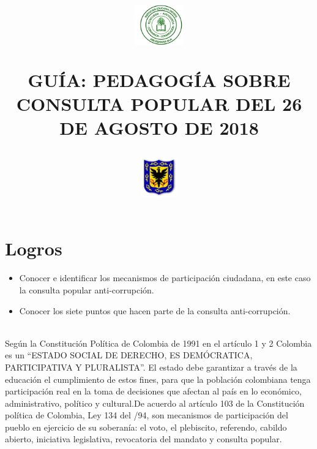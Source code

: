 \documentclass[twoside]{article}
\title{\begin{minipage}{.2\textwidth}
\includegraphics[height=1.75cm]{Images/logo-colegio.png}\end{minipage}
\begin{minipage}{.55\textwidth}
\begin{center}
GUÍA: PEDAGOGÍA SOBRE CONSULTA POPULAR DEL 26 DE AGOSTO DE 2018\\
\end{center}
\end{minipage}\hfill
\begin{minipage}{.2\textwidth}
\includegraphics[height=1.75cm]{Images/logo-sed.png} 
\end{minipage}}
\date{}
\begin{document}
\maketitle
\vspace{-1cm}
\section*{Logros}
\begin{itemize}
\item Conocer e identificar  los mecanismos de participación ciudadana, en este caso la consulta popular anti-corrupción.
\item Conocer los siete puntos  que hacen parte de la consulta anti-corrupción. 
\end{itemize}
\\
  
Según la Constitución Política de Colombia de 1991 en el artículo 1 y 2 Colombia es un “ESTADO SOCIAL DE DERECHO, ES DEMÓCRATICA, PARTICIPATIVA Y PLURALISTA”. El estado debe garantizar a través de la educación el cumplimiento de estos fines, para que la población colombiana tenga participación real en la toma de decisiones que afectan al país en lo económico, administrativo, político y cultural.De acuerdo al artículo 103 de la Constitución política de Colombia, Ley 134 del /94, son mecanismos de participación del pueblo en ejercicio de su soberanía: el voto, el plebiscito, referendo, cabildo abierto, iniciativa legislativa, revocatoria del mandato y consulta popular.
\end{document}
